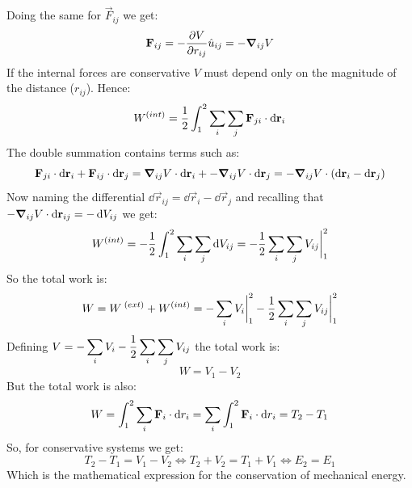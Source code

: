 Doing the same for $\vec{F}_{ij}$ we get:
\begin{equation}
    \vb{F}_{ij}= -\dfrac{\partial V}{\partial r_{ij}}\hat{u}_{ij}= -\grad_{ij}V
\end{equation}
If the internal forces are conservative $V$ must depend only on the magnitude of the distance ($r_{ij}$). Hence:
\begin{equation}
    W^{(int)}=\dfrac{1}{2}\int_{1}^{2}\displaystyle\sum_i\displaystyle\sum_j\vb{F}_{ji}\cdot\dd{\vb{r}_i}
\end{equation}
The double summation contains terms such as:
\begin{equation}
    \vb{F}_{ji}\cdot\dd{\vb{r}_i} + \vb{F}_{ij}\cdot\dd{\vb{r}_j} = \grad_{ij}V\cdot\dd{\vb{r}_i} + -\grad_{ij}V\cdot\dd{\vb{r}_j} = -\grad_{ij}V\cdot\left(\dd{\vb{r}_i}-\dd{\vb{r}_j}\right)
\end{equation}
Now naming the differential $\dd{\vec{r}_{ij}}=\dd{\vec{r}_i}-\dd{\vec{r}_j}$ and recalling that $-\grad_{ij}V\cdot\dd{\vb{r}_{ij}} = -\dd{V_{ij}}$ we get:
\begin{equation}
    W^{(int)}=-\dfrac{1}{2}\int_{1}^{2}\displaystyle\sum_i\displaystyle\sum_j\dd{V_{ij}} = -\dfrac{1}{2}\displaystyle\sum_i\displaystyle\sum_j V_{ij}\bigg|_{1}^{2}
\end{equation}
So the total work is:
\begin{equation}
    W = W^{\;(ext)}+W^{(int)}= -\displaystyle\sum_i V_i\bigg|_{1}^{2} -\dfrac{1}{2}\displaystyle\sum_i\displaystyle\sum_j V_{ij}\bigg|_{1}^{2}
\end{equation}
Defining $V=-\displaystyle\sum_i V_i -\dfrac{1}{2}\displaystyle\sum_i\displaystyle\sum_j V_{ij}$ the total work is:
\begin{equation}
    W = V_1-V_2
\end{equation}
But the total work is also:
\begin{equation}
    W = \int_{1}^{2}\displaystyle\sum_i \vb{F}_i \cdot \dd{r_i}= \displaystyle\sum_i \int_{1}^{2} \vb{F}_i \cdot \dd{r_i} = T_2 - T_1
\end{equation}
So, for conservative systems we get:
\begin{equation}
    T_2 - T_1 = V_1 - V_2 \iff T_2 + V_2 = T_1 + V_1 \iff E_2 = E_1
\end{equation}
Which is the mathematical expression for the conservation of mechanical energy.
